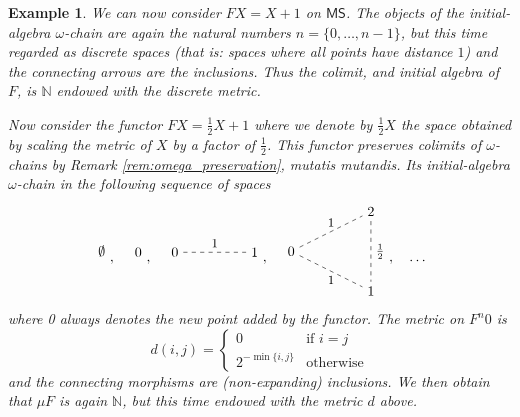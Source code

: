 \documentclass[letterpaper, 11pt, oneside]{memoir}
\theoremstyle{myteo}
\newtheorem{example}[theorem]{Example}
\numberwithin{equation}{section}
\newcommand{\MS}{\textsf{MS}}
\newcommand{\N}{\mathbb{N}}
\begin{document}
\begin{example}
  We can now consider \(FX = X + 1\) on \(\MS\).
  The objects of the initial-algebra \(\omega\)-chain are again the natural numbers \(n = \{0, \ldots, n-1\}\), but this time regarded as discrete spaces (that is: spaces where all points have distance \(1\)) and the connecting arrows are the inclusions.
  Thus the colimit, and initial algebra of \(F\), is \(\N\) endowed with the discrete metric.

  Now consider the functor \(FX = \frac{1}{2}X + 1\) where we denote by \(\frac{1}{2}X\) the space obtained by scaling the metric of \(X\) by a factor of \(\frac{1}{2}\).
  This functor preserves colimits of \(\omega\)-chains by Remark \ref{rem:omega_preservation}, mutatis mutandis.
  Its initial-algebra \(\omega\)-chain in the following sequence of spaces
  \begin{equation*}
    \begin{tikzpicture}[every node/.style={outer sep=0.5cm}]
      \node (1) at (0, 0){\(\emptyset\)};
    \end{tikzpicture},\quad
    \begin{tikzpicture}[every node/.style={outer sep=0.5cm}]
      \node (1) at (0, 0){\(0\)};
    \end{tikzpicture},\quad
    \begin{tikzpicture}
      \node (1) at (0, 0){\(0\)};
      \node (2) at (2, 0){\(1\)};
      \node (3) at (1, 0)[above]{\small 1};
      \draw[dashed] (1) to (2);
    \end{tikzpicture},\quad
    \begin{tikzpicture}[baseline=-0.25cm]
      \node (1) at (0, 0){\(0\)};
      \node (2) at (2, 1){\(2\)};
      \node (3) at (2, -1){\(1\)};
      
      \draw[dashed] (1) -- (2) node[midway, above]{\small 1};
      \draw[dashed] (1) -- (3) node[midway, below]{\small 1};
      \draw[dashed] (2) -- (3) node[midway, right]{\small \(\frac{1}{2}\)};
    \end{tikzpicture},\quad
    \ldots
  \end{equation*}
  where 0 always denotes the new point added by the functor.
  The metric on \(F^n0\) is
  \begin{equation*}
    d(i, j) =
    \begin{cases}
      0 & \text{if \(i = j\)}\\
      2^{-\min\{i, j\}} & \text{otherwise}
    \end{cases}
  \end{equation*}
  and the connecting morphisms are (non-expanding) inclusions.
  We then obtain that \(\mu F\) is again \(\N\), but this time endowed with the metric \(d\) above.
\end{example}
\end{document}
